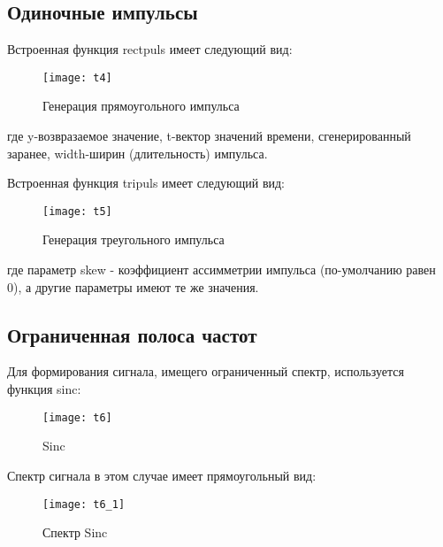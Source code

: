 \subsection{Одиночные импульсы}
Встроенная функция rectpuls имеет следующий вид:
\begin{figure}[H]
	\begin{center}
		\texttt{[image: t4]}
		\caption{Генерация прямоугольного импульса} 
		\label{pic:t4} %
	\end{center}
\end{figure}
где y-возвразаемое значение, t-вектор значений времени, сгенерированный заранее, width-ширин (длительность) импульса.

Встроенная функция tripuls имеет следующий вид:
\begin{figure}[H]
	\begin{center}
		\texttt{[image: t5]}
		\caption{Генерация треугольного импульса} 
		\label{pic:t5} %
	\end{center}
\end{figure}
где параметр skew - коэффициент ассимметрии импульса (по-умолчанию равен 0), а другие параметры имеют те же значения.

\subsection{Ограниченная полоса частот}
Для формирования сигнала, имещего ограниченный спектр, используется функция sinc:
\begin{figure}[H]
	\begin{center}
		\texttt{[image: t6]}
		\caption{Sinc} 
		\label{pic:t6} %
	\end{center}
\end{figure}
Спектр сигнала в этом случае имеет прямоугольный вид:
\begin{figure}[H]
	\begin{center}
		\texttt{[image: t6\_1]}
		\caption{Спектр Sinc} 
		\label{pic:t6_1} %
	\end{center}
\end{figure}


